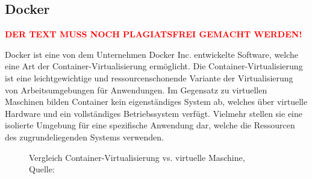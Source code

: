\subsection{Docker}


\textcolor{red}{\textbf{DER TEXT MUSS NOCH PLAGIATSFREI GEMACHT WERDEN!}}

Docker ist eine von dem Unternehmen Docker Inc. entwickelte Software, welche eine Art der Container-Virtualisierung ermöglicht. 
Die Container-Virtualisierung ist eine leichtgewichtige und ressourcenschonende Variante der Virtualisierung von Arbeitsumgebungen für Anwendungen. 
Im Gegensatz zu virtuellen Maschinen bilden Container kein eigenständiges System ab, welches über virtuelle Hardware und ein vollständiges Betriebssystem verfügt. 
Vielmehr stellen sie eine isolierte Umgebung für eine spezifische Anwendung dar, welche die Ressourcen des zugrundeliegenden Systems verwenden. 

\begin{figure}[h]
	\centering
	\captionsetup{justification=centering}
	\hspace{1cm}
	\caption[Vergleich Container-Virtualisierung vs. virtuelle Maschine]{\label{fig:docker_container}Vergleich Container-Virtualisierung vs. virtuelle Maschine, \\Quelle: \cite{MS-DockerInc..05.03.2019}}
\end{figure}


